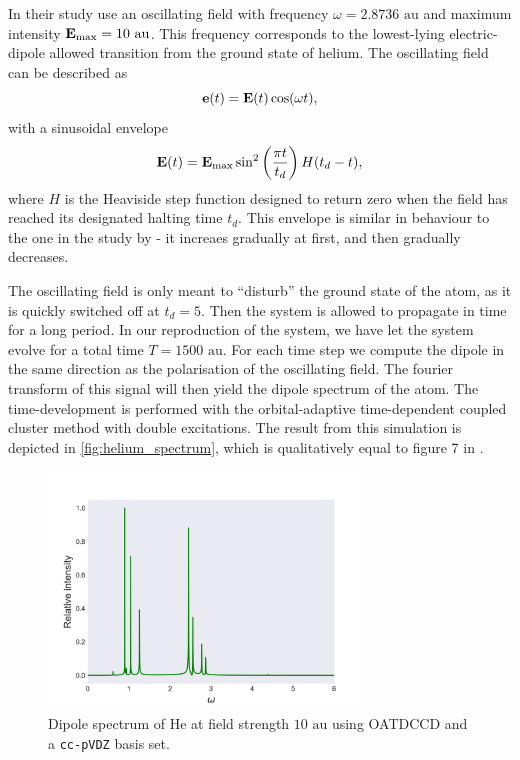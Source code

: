 In their study \citeauthor{pedersen2019symplectic} use an oscillating field with 
frequency $\omega=2.8736 \text{ au}$ and maximum intensity
$\vb{E}_\text{max} = 10 \text{ au}$. This frequency corresponds to the lowest-lying 
electric-dipole allowed transition from the ground state of helium. The oscillating 
field can be described as 
\begin{equation}
    \vb{e}(t) = \vb{E}(t) \cos(\omega t),
\end{equation}
with a sinusoidal envelope
\begin{equation}
    \label{eq:pedersen_2019_envelope}
    \vb{E}(t) = \vb{E}_\text{max}\sin^2\left(\frac{\pi t}{t_d}\right) H(t_d - t),
\end{equation}
where $H$ is the Heaviside step function designed to return zero when the field 
has reached its designated halting time $t_d$. This envelope is similar in behaviour 
to the one in the study by \citeauthor{li2005time}\cite{li2005time} - it 
increaes gradually at first, and then gradually decreases. 

The oscillating field is only meant to ``disturb'' the ground state of the atom,
as it is quickly 
switched off at $t_d=5$. Then the system is allowed to propagate in time for 
a long period. In our reproduction of the system, we have let the system 
evolve for a total time $T=1500 \text{ au}$. For each time step we compute the 
dipole in the same direction as the polarisation of the oscillating field. The 
fourier transform of this signal will then yield the dipole spectrum of the 
atom. The time-development is performed with the orbital-adaptive time-dependent 
coupled cluster method with double excitations. The result from this simulation is 
depicted in \autoref{fig:helium_spectrum}, which is qualitatively equal to figure 
7 in \citeauthor{pedersen2019symplectic}\cite{pedersen2019symplectic}.

\begin{figure}
    \centering
    \includegraphics[width=0.75\textwidth]{results/figures/helium_spectrum.png} 
    \caption{Dipole spectrum of He at field strength $10\text{ au}$ using 
        OATDCCD and a \lstinline{cc-pVDZ} basis set.      
    }
    \label{fig:helium_spectrum}
\end{figure}


